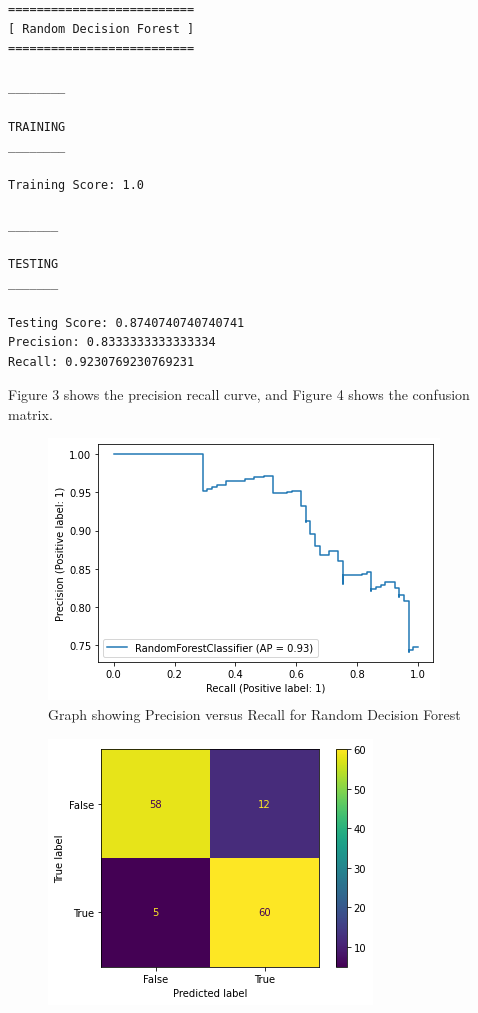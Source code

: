 \documentclass[conference]{IEEEtran}
\begin{document}
\begin{enumerate}
\begin{verbatim}
==========================
[ Random Decision Forest ]
==========================

________

TRAINING
________

Training Score: 1.0

_______

TESTING
_______

Testing Score: 0.8740740740740741
Precision: 0.8333333333333334
Recall: 0.9230769230769231
\end{verbatim}
Figure 3 shows the precision recall curve, and Figure 4 shows the confusion matrix. 
\begin{figure}[htbp]
\centerline{\includegraphics[width = \linewidth]{RF}}
\label{fig3}
\caption{Graph showing Precision versus Recall for Random Decision Forest}
\end{figure}
\begin{figure}[htbp]
\centerline{\includegraphics[width = \linewidth]{CM_RF}}

\end{figure}
\end{enumerate}
\end{document}
